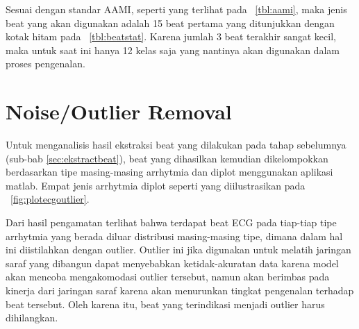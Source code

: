 
Sesuai dengan standar AAMI, seperti yang terlihat pada \tab~\ref{tbl:aami}, maka
jenis beat yang akan digunakan adalah 15 beat pertama yang ditunjukkan dengan
kotak hitam pada \tab~\ref{tbl:beatstat}. Karena jumlah 3 beat terakhir sangat
kecil, maka untuk saat ini hanya 12 kelas saja yang nantinya akan digunakan
dalam proses pengenalan. 


\section{Noise/Outlier Removal}
Untuk menganalisis hasil ekstraksi beat yang dilakukan pada tahap sebelumnya
(sub-bab \ref{sec:ekstractbeat}), beat yang dihasilkan kemudian dikelompokkan
berdasarkan tipe masing-masing arrhytmia dan diplot menggunakan aplikasi matlab.
Empat jenis arrhytmia diplot seperti yang diilustrasikan pada
\pic~\ref{fig:plotecgoutlier}.


Dari hasil pengamatan terlihat bahwa terdapat beat ECG pada tiap-tiap tipe
arrhytmia yang berada diluar distribusi masing-masing tipe, dimana dalam
hal ini diistilahkan dengan outlier. Outlier ini jika digunakan untuk melatih
jaringan saraf yang dibangun dapat menyebabkan ketidak-akuratan data karena 
model akan mencoba mengakomodasi outlier tersebut, namun akan berimbas pada 
kinerja dari jaringan saraf karena akan menurunkan tingkat pengenalan terhadap
beat tersebut. Oleh karena itu, beat yang terindikasi menjadi outlier harus dihilangkan.

